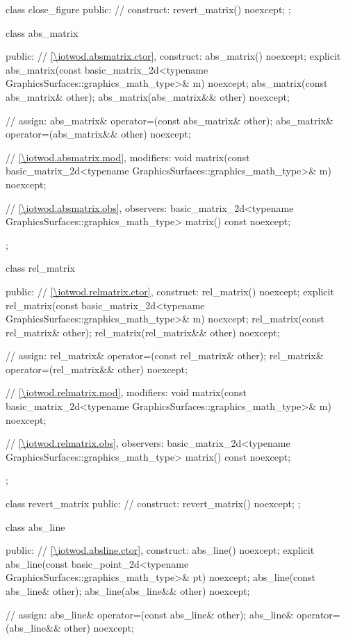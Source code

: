 \begin{codeblock}
{{    class close_figure {
    public:
      // construct:
      revert_matrix() noexcept;
    };

    class abs_matrix {
    public:
      // \ref{\iotwod.absmatrix.ctor}, construct:
      abs_matrix() noexcept;
      explicit abs_matrix(const basic_matrix_2d<typename
        GraphicsSurfaces::graphics_math_type>& m) noexcept;
      abs_matrix(const abs_matrix& other);
      abs_matrix(abs_matrix&& other) noexcept;

      // assign:
      abs_matrix& operator=(const abs_matrix& other);
      abs_matrix& operator=(abs_matrix&& other) noexcept;

      // \ref{\iotwod.absmatrix.mod}, modifiers:
      void matrix(const basic_matrix_2d<typename
        GraphicsSurfaces::graphics_math_type>& m) noexcept;
	
      // \ref{\iotwod.absmatrix.obs}, observers:
      basic_matrix_2d<typename
        GraphicsSurfaces::graphics_math_type> matrix() const noexcept;
    };

    class rel_matrix {
    public:
      // \ref{\iotwod.relmatrix.ctor}, construct:
      rel_matrix() noexcept;
      explicit rel_matrix(const basic_matrix_2d<typename
        GraphicsSurfaces::graphics_math_type>& m) noexcept;
      rel_matrix(const rel_matrix& other);
      rel_matrix(rel_matrix&& other) noexcept;

      // assign:
      rel_matrix& operator=(const rel_matrix& other);
      rel_matrix& operator=(rel_matrix&& other) noexcept;

      // \ref{\iotwod.relmatrix.mod}, modifiers:
      void matrix(const basic_matrix_2d<typename
        GraphicsSurfaces::graphics_math_type>& m) noexcept;
	
      // \ref{\iotwod.relmatrix.obs}, observers:
      basic_matrix_2d<typename
        GraphicsSurfaces::graphics_math_type> matrix() const noexcept;
    };

    class revert_matrix {
    public:
      // construct:
      revert_matrix() noexcept;
    };

    class abs_line {
    public:
      // \ref{\iotwod.absline.ctor}, construct:
      abs_line() noexcept;
      explicit abs_line(const basic_point_2d<typename
        GraphicsSurfaces::graphics_math_type>& pt) noexcept;
      abs_line(const abs_line& other);
      abs_line(abs_line&& other) noexcept;

      // assign:
      abs_line& operator=(const abs_line& other);
      abs_line& operator=(abs_line&& other) noexcept;

}}}
\end{codeblock}
